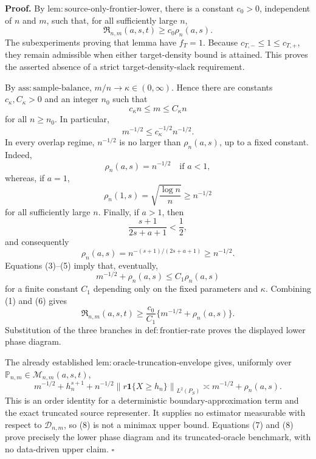 \textbf{Proof.}
By \(\mathrm{lem:source\text{-}only\text{-}frontier\text{-}lower}\), there is a constant \(c_0>0\), independent of \(n\) and \(m\), such that, for all sufficiently large \(n\),
\[
 \mathfrak R_{n,m}(a,s,t)\ge c_0\rho_n(a,s).
\tag{1}
\]
The subexperiments proving that lemma have \(f_T=1\).  Because \(c_{T,-}\le1\le c_{T,+}\), they remain admissible when either target-density bound is attained.  This proves the asserted absence of a strict target-density-slack requirement.

By \(\mathrm{ass:sample\text{-}balance}\), \(m/n\to\kappa\in(0,\infty)\).  Hence there are constants \(c_\kappa,C_\kappa>0\) and an integer \(n_0\) such that
\[
 c_\kappa n\le m\le C_\kappa n
\tag{2}
\]
for all \(n\ge n_0\).  In particular,
\[
 m^{-1/2}\le c_\kappa^{-1/2}n^{-1/2}.
\tag{3}
\]
In every overlap regime, \(n^{-1/2}\) is no larger than \(\rho_n(a,s)\), up to a fixed constant.  Indeed,
\[
 \rho_n(a,s)=n^{-1/2}\quad\text{if }a<1,
\]
whereas, if \(a=1\),
\[
 \rho_n(1,s)=\sqrt{\frac{\log n}{n}}\ge n^{-1/2}
\tag{4}
\]
for all sufficiently large \(n\).  Finally, if \(a>1\), then
\[
 \frac{s+1}{2s+a+1}<\frac12,
\]
and consequently
\[
 \rho_n(a,s)=n^{-(s+1)/(2s+a+1)}\ge n^{-1/2}.
\tag{5}
\]
Equations (3)--(5) imply that, eventually,
\[
 m^{-1/2}+\rho_n(a,s)\le C_1\rho_n(a,s)
\tag{6}
\]
for a finite constant \(C_1\) depending only on the fixed parameters and \(\kappa\).  Combining (1) and (6) gives
\[
 \mathfrak R_{n,m}(a,s,t)
 \ge \frac{c_0}{C_1}\{m^{-1/2}+\rho_n(a,s)\}.
\tag{7}
\]
Substitution of the three branches in \(\mathrm{def:frontier\text{-}rate}\) proves the displayed lower phase diagram.

The already established \(\mathrm{lem:oracle\text{-}truncation\text{-}envelope}\) gives, uniformly over \(\mathbb P_{n,m}\in\mathcal M_{n,m}(a,s,t)\),
\[
 m^{-1/2}+h_n^{s+1}
 +n^{-1/2}\left\|r\mathbf 1\{X\ge h_n\}\right\|_{L^2(P_S)}
 \asymp m^{-1/2}+\rho_n(a,s).
\tag{8}
\]
This is an order identity for a deterministic boundary-approximation term and the exact truncated source representer.  It supplies no estimator measurable with respect to \(\mathcal D_{n,m}\), so (8) is not a minimax upper bound.  Equations (7) and (8) prove precisely the lower phase diagram and its truncated-oracle benchmark, with no data-driven upper claim. \(\square\)